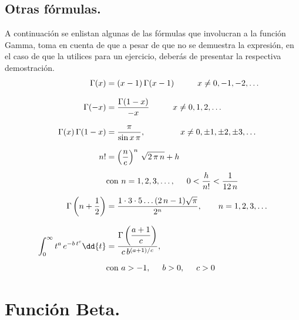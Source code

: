 \subsection{Otras fórmulas.}
A continuación se enlistan algunas de las fórmulas que involucran a la función Gamma, toma en cuenta de que a pesar de que no se demuestra la expresión, en el caso de que la utilices para un ejercicio, deberás de presentar la respectiva demostración.
{\fontsize{12}{12}\selectfont
\begin{align*}
\Gamma (x) &= (x - 1) \, \Gamma(x - 1) \hspace{1cm} x \neq 0, -1, -2, \ldots \\[0.75em]
\Gamma (-x) &= \dfrac{\Gamma (1- x)}{-x} \hspace{1cm} x \neq 0, 1, 2, \ldots \\[0.75em]
\Gamma (x) \, \Gamma (1 - x) &= \dfrac{\pi}{\sin x \, \pi}, \hspace{1.5cm} x \neq 0, \pm 1, \pm 2, \pm 3, \ldots \\[0.75em]
n! &= \left( \dfrac{n}{e} \right)^{n} \, \sqrt{2 \, \pi \, n} + h \\[0.5em]
&\mbox{con } n = 1, 2, 3, \ldots, \hspace{0.5cm} 0 < \dfrac{h}{n!} < \dfrac{1}{12 \, n} \\[0.5em]
\Gamma \left(n + \dfrac{1}{2} \right) &= \dfrac{1 \cdot 3 \cdot 5 \ldots (2 \, n - 1)\sqrt{\pi}}{2^{n}}, \hspace{0.7cm} n = 1, 2, 3, \ldots \\[0.75em]
\int_{0}^{\infty} t^{a} \, e^{-b \, t^{c}} \dd{t} &= \dfrac{\Gamma \left(\dfrac{a + 1}{c} \right)}{c \, b^{(a+1)/c}}, \\[0.5em]
&\mbox{con } a > -1, \hspace{0.5cm} b > 0, \hspace{0.5cm} c > 0   
\end{align*}
}
\section{Función Beta.}
